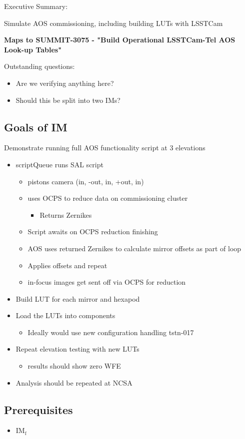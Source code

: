 
Executive Summary:

Simulate AOS commissioning, including building LUTs with LSSTCam

\textbf{Maps to SUMMIT-3075 - "Build Operational LSSTCam-Tel AOS Look-up Tables"}

Outstanding questions:
\begin{itemize}
\item Are we verifying anything here?
\item Should this be split into two IMs?
\end{itemize}

\subsection{Goals of IM}
Demonstrate running full AOS functionality script at 3 elevations
\begin{itemize}
\item scriptQueue runs SAL script
  \begin{itemize}
  \item pistons camera (in, -out, in, +out, in)
  \item uses \gls{OCPS} to reduce data on commissioning cluster
    \begin{itemize}
    \item Returns Zernikes
    \end{itemize}
  \item Script awaits on \gls{OCPS} reduction finishing
  \item AOS uses returned Zernikes to calculate mirror offsets as part of loop
  \item Applies offsets and repeat
  \item in-focus images get sent off via \gls{OCPS} for reduction
  \end{itemize}
\end{itemize}
\begin{itemize}
\item Build LUT for each mirror and hexapod
\item Load the LUTs into components
  \begin{itemize}
  \item Ideally would use new configuration handling tstn-017
  \end{itemize}
\item Repeat elevation testing with new LUTs
  \begin{itemize}
  \item results should show zero WFE
  \end{itemize}
\item Analysis should be repeated at NCSA
\end{itemize}

\subsection{Prerequisites}
\begin{itemize}
\item IM\(_{\text{f}}\)
\end{itemize}
